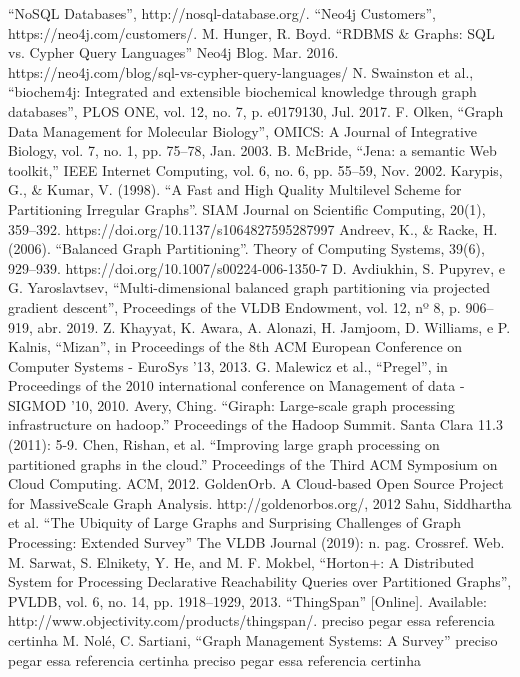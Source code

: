 \documentclass[conference]{IEEEtran}
\begin{document}
\begin{thebibliography}{00}
 ``NoSQL Databases'', http://nosql-database.org/.
 ``Neo4j Customers'', https://neo4j.com/customers/.
 M. Hunger, R. Boyd. ``RDBMS \& Graphs: SQL vs. Cypher Query Languages'' Neo4j Blog. Mar. 2016. https://neo4j.com/blog/sql-vs-cypher-query-languages/
 N. Swainston et al., ``biochem4j: Integrated and extensible biochemical knowledge through graph databases'', PLOS ONE, vol. 12, no. 7, p. e0179130, Jul. 2017.
 F. Olken, ``Graph Data Management for Molecular Biology'', OMICS: A Journal of Integrative Biology, vol. 7, no. 1, pp. 75–78, Jan. 2003.
 B. McBride, ``Jena: a semantic Web toolkit,” IEEE Internet Computing, vol. 6, no. 6, pp. 55–59, Nov. 2002.
 Karypis, G., \& Kumar, V. (1998). ``A Fast and High Quality Multilevel Scheme for Partitioning Irregular Graphs''. SIAM Journal on Scientific Computing, 20(1), 359–392. https://doi.org/10.1137/s1064827595287997
 Andreev, K., \& Racke, H. (2006). ``Balanced Graph Partitioning''. Theory of Computing Systems, 39(6), 929–939. https://doi.org/10.1007/s00224-006-1350-7
 D. Avdiukhin, S. Pupyrev, e G. Yaroslavtsev, ``Multi-dimensional balanced graph partitioning via projected gradient descent'', Proceedings of the VLDB Endowment, vol. 12, nº 8, p. 906–919, abr. 2019.
 Z. Khayyat, K. Awara, A. Alonazi, H. Jamjoom, D. Williams, e P. Kalnis, ``Mizan'', in Proceedings of the 8th ACM European Conference on Computer Systems - EuroSys ’13, 2013.
 G. Malewicz et al., ``Pregel'', in Proceedings of the 2010 international conference on Management of data - SIGMOD ’10, 2010.
 Avery, Ching. ``Giraph: Large-scale graph processing infrastructure on hadoop.'' Proceedings of the Hadoop Summit. Santa Clara 11.3 (2011): 5-9.
 Chen, Rishan, et al. ``Improving large graph processing on partitioned graphs in the cloud.'' Proceedings of the Third ACM Symposium on Cloud Computing. ACM, 2012.
 GoldenOrb. A Cloud-based Open Source Project for MassiveScale Graph Analysis. http://goldenorbos.org/, 2012
 Sahu, Siddhartha et al. ``The Ubiquity of Large Graphs and Surprising Challenges of Graph Processing: Extended Survey'' The VLDB Journal (2019): n. pag. Crossref. Web.
 M. Sarwat, S. Elnikety, Y. He, and M. F. Mokbel, ``Horton+: A Distributed System for Processing Declarative Reachability Queries over Partitioned Graphs'', PVLDB, vol. 6, no. 14, pp. 1918–1929, 2013.
 ``ThingSpan'' [Online]. Available: http://www.objectivity.com/products/thingspan/.
 {\color{red} preciso pegar essa referencia certinha} M. Nolé, C. Sartiani, ``Graph Management Systems: A Survey''
 {\color{red} preciso pegar essa referencia certinha}
 {\color{red} preciso pegar essa referencia certinha}

\end{thebibliography}
\end{document}
